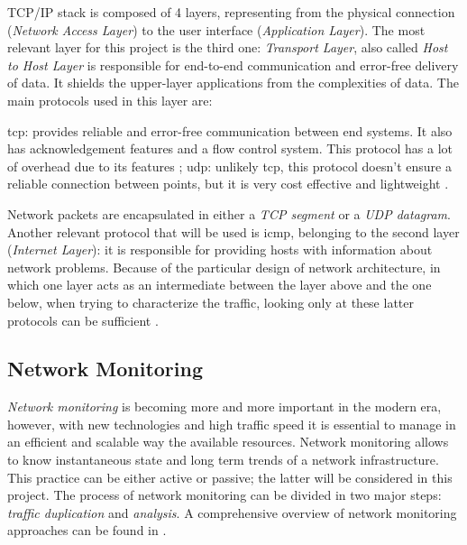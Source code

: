 \noindent TCP/IP stack is composed of 4 layers, representing from the physical connection (\textit{Network Access Layer}) to the user interface (\textit{Application Layer}). The most relevant layer for this project is the third one: \textit{Transport Layer}, also called \textit{Host to Host Layer} is responsible for end-to-end communication and error-free delivery of data. It shields the upper-layer applications from the complexities of data. The main protocols used in this layer are:

\begin{itemize}
    \itemAR \gls{tcp}: provides reliable and error-free communication between end systems. It also has acknowledgement features and a flow control system. This protocol has a lot of overhead due to its features \cite{Kurose2012};
    \itemAR \gls{udp}: unlikely \gls{tcp}, this protocol doesn't ensure a reliable connection between points, but it is very cost effective and lightweight \cite{Kurose2012}.
\end{itemize}
Network packets are encapsulated in either a \textit{TCP segment} or a \textit{UDP datagram}. Another relevant protocol that will be used is \gls{icmp}, belonging to the second layer (\textit{Internet Layer}): it is responsible for providing hosts with information about network problems. Because of the particular design of network architecture, in which one layer acts as an intermediate between the layer above and the one below, when trying to characterize the traffic, looking only at these latter protocols can be sufficient \cite{Iglesias2015}.


\subsection{Network Monitoring}
\label{subsec:network-monitoring}

\textit{Network monitoring} is becoming more and more important in the modern era, however, with new technologies and high traffic speed it is essential to manage in an efficient and scalable way the available resources. Network monitoring allows to know instantaneous state and long term trends of a network infrastructure. This practice can be either active or passive; the latter will be considered in this project. The process of network monitoring can be divided in two major steps: \textit{traffic duplication} and \textit{analysis}. A comprehensive overview of network monitoring approaches can be found in \cite{Svoboda2015}.

